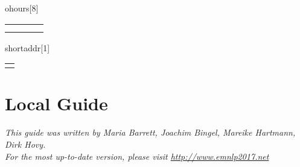 \newenvironment{fooditemwourl}[6]{
\noindent
\begin{minipage}[t]{.5\textwidth}\textbf{#1} \end{minipage}\hfill\begin{minipage}[t]{.2\textwidth}\begin{right}\textbf{#4}\ \ \ \ \ \textbf{#5} \end{right}\end{minipage}
\par \noindent\emph{#2}
\par \noindent\begin{minipage}[t]{.37\textwidth}{#3}\end{minipage}\begin{minipage}[t]{.63\textwidth}{#6}\end{minipage}
\medskip
}

\newenvironment{ohours}[8]{%
{\begin{tabular}{l l l l} 
#1&#2&#5&#6 \\
#3&#4&#7&#8
\end{tabular}}
}

\newenvironment{addr}[2]{
{\begin{tabular}{l} 
#1\\
#2
\end{tabular}}
}

\newenvironment{shortaddr}[1]{
{\begin{tabular}{p{\textwidth}} 
#1
\end{tabular}}
}











\chapter{Local Guide}


\emph{This guide was written by Maria Barrett, Joachim Bingel, Mareike Hartmann, Dirk Hovy.\\
\noindent For the most up-to-date version, please visit
  \url{http://www.emnlp2017.net}}
  


